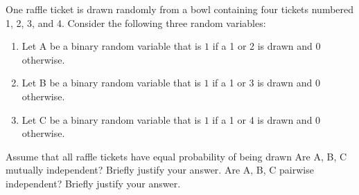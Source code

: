 \documentclass[12pt,twoside]{article}
\begin{document}
\newpage
\begin{problem}{10}
One raffle ticket is drawn randomly from a bowl containing four tickets numbered 1, 2, 3, and 4. Consider the following three random variables:
\begin{enumerate}
\item Let A be a binary random variable that is $1$ if a 1 or 2 is drawn and $0$ otherwise. 
\item Let B be a binary random variable that is $1$ if a 1 or 3 is drawn and $0$ otherwise.
\item Let C be a binary random variable that is $1$ if a 1 or 4 is drawn and $0$ otherwise.
\end{enumerate}
Assume that all raffle tickets have equal probability of being drawn
\bparts
{} Are A, B, C mutually independent? Briefly justify your answer. 
\vspace{3in}
\newpage
{} Are A, B, C pairwise independent? Briefly justify your answer.
\eparts
\end{problem}
\end{document}
